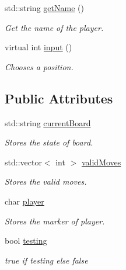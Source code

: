 \begin{DoxyCompactItemize}
std\+::string \mbox{\hyperlink{classPlayer_af9a6045fa96f736664c4eab4caa5e8e5}{get\+Name}} ()
\begin{DoxyCompactList}\small\item\em Get the name of the player. \end{DoxyCompactList}\item 
virtual int \mbox{\hyperlink{classPlayer_a3e7c5ce7c59c8b5cc9d0b985a1baae91}{input}} ()
\begin{DoxyCompactList}\small\item\em Chooses a position. \end{DoxyCompactList}\end{DoxyCompactItemize}
\subsection*{Public Attributes}
\begin{DoxyCompactItemize}
\item 
\mbox{\label{classPlayer_ad0068d87dfc2815e83095346c2818861}} 
std\+::string \mbox{\hyperlink{classPlayer_ad0068d87dfc2815e83095346c2818861}{current\+Board}}
\begin{DoxyCompactList}\small\item\em Stores the state of board. \end{DoxyCompactList}\item 
\mbox{\label{classPlayer_a03462bb888096d385a2fe41f1d55669d}} 
std\+::vector$<$ int $>$ \mbox{\hyperlink{classPlayer_a03462bb888096d385a2fe41f1d55669d}{valid\+Moves}}
\begin{DoxyCompactList}\small\item\em Stores the valid moves. \end{DoxyCompactList}\item 
\mbox{\label{classPlayer_ac6c86ccc94d6ba66e72c4746a2b011ac}} 
char \mbox{\hyperlink{classPlayer_ac6c86ccc94d6ba66e72c4746a2b011ac}{player}}
\begin{DoxyCompactList}\small\item\em Stores the marker of player. \end{DoxyCompactList}\item 
\mbox{\label{classPlayer_abbc584e63a1b20690a48e429410e263d}} 
bool \mbox{\hyperlink{classPlayer_abbc584e63a1b20690a48e429410e263d}{testing}}
\begin{DoxyCompactList}\small\item\em true if testing else false \end{DoxyCompactList}\end{DoxyCompactItemize}


